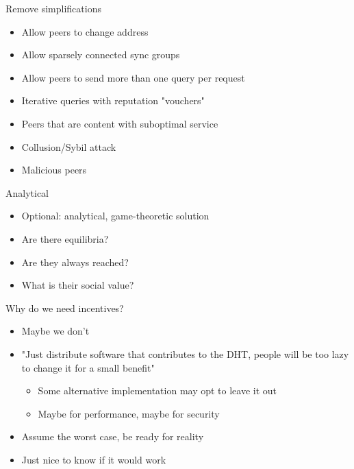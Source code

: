 \documentclass[presentation,english,usenames,dvipsnames]{beamer}
\begin{document}
\begin{frame}{Remove simplifications}
  \begin{itemize}
    \item Allow peers to change address
    \item Allow sparsely connected sync groups
    \item Allow peers to send more than one query per request
    \item Iterative queries with reputation "vouchers"
    \item Peers that are content with suboptimal service
    \item Collusion/Sybil attack
    \item Malicious peers
  \end{itemize}
\end{frame}

\begin{frame}{Analytical}
  \begin{itemize}
    \item Optional: analytical, game-theoretic solution
    \item Are there equilibria?
    \item Are they always reached?
    \item What is their social value?
  \end{itemize}
\end{frame}

\begin{frame}
\end{frame}

\begin{frame}{Why do we need incentives?}
  \begin{itemize}
    \item Maybe we don't
    \item "Just distribute software that contributes to the DHT, people will be
          too lazy to change it for a small benefit"
          \begin{itemize}
            \item Some alternative implementation may opt to leave it out
            \item Maybe for performance, maybe for security
          \end{itemize}
    \item Assume the worst case, be ready for reality
    \item Just nice to know if it would work
  \end{itemize}
\end{frame}
\end{document}
